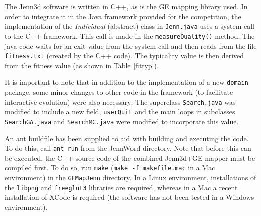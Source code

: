 \documentclass{article}
\begin{document}
The Jenn3d software is written in C++, as is the GE mapping library used. In
order to integrate it in the Java framework provided for the competition, the
implementation of the \textit{Individual} (abstract) class in \texttt{Jenn.java} uses 
a system call to the C++ framework. This call is made in the \texttt{measureQuality()} 
method. The java code waits for an exit value from the system call and then reads 
from the file \texttt{fitness.txt} (created by the C++ code). The typicality value is then 
derived from the fitness value (as shown in Table \ref{fittyp}).

It is important to note that in addition to the implementation of a new \texttt{domain} 
package, some minor changes to other code in the framework (to facilitate interactive evolution)
were also necessary. The superclass \texttt{Search.java} was modified to include a new field, 
\texttt{userQuit} and the main loops in subclasses \texttt{SearchGA.java} and \texttt{SearchMC.java} 
were modified to incorporate this value.

An ant buildfile has been supplied to aid with building and executing the code. To do this, call 
\texttt{ant run} from the JennWord directory. Note that before this can be executed, the 
C++ source code of the combined Jenn3d+GE mapper must be compiled first. To do
so, run \texttt{make} (\texttt{make -f makefile.mac} in a Mac environment) in
the \texttt{GEMapJenn} directory. In a Linux environment, installations of
the \texttt{libpng} and \texttt{freeglut3} libraries are required, whereas in a Mac 
a recent installation of XCode is required (the software has not been tested in a 
Windows environment).
\end{document}
